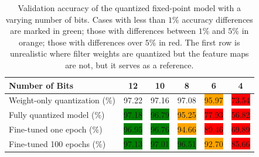 \documentclass{article}
\begin{document}
%
%
\begin{table}
    \centering
    \caption{Validation accuracy of the quantized  fixed-point model 
 with a varying number of bits. Cases with less than $1\%$ accuracy differences are marked in green; those with differences between $1\%$ and $5\%$ in orange; those with differences over $5\%$  in red. The first row is unrealistic where filter weights are quantized but the feature maps are not, but it serves as a reference.}
    \label{tab:quant}
    \begin{tabular}{l c c c c c }
        \toprule
        Number of Bits & 12 & 10 & 8 & 6 & 4\\
        \midrule
        Weight-only quantization (\%) & \colorbox{white}{97.22} & \colorbox{white}{97.16} & \colorbox{white}{97.08} & \colorbox{orange}{95.97}  & \colorbox{red}{73.54}\\
        Fully quantized model (\%) & \colorbox{green}{97.18} & \colorbox{green}{96.79} & \colorbox{orange}{95.25} & \colorbox{red}{77.93}  & \colorbox{red}{56.82} \\
        Fine-tuned one epoch (\%) & \colorbox{green}{96.95} & \colorbox{green}{96.76} & \colorbox{orange}{94.66} & \colorbox{red}{89.46} & \colorbox{red}{69.89}\\
        Fine-tuned 100 epochs (\%) & \colorbox{green}{97.13} & \colorbox{green}{97.01} & \colorbox{green}{96.51} & \colorbox{orange}{92.70} & \colorbox{red}{85.66}\\
        \bottomrule
    \end{tabular}
\end{table}
%
\end{document}
